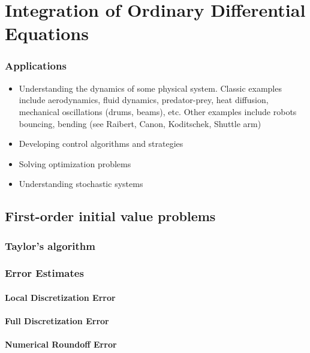 \chapter{Integration of Ordinary Differential Equations}

\subsection*{Applications}
\begin{itemize}
    \item Understanding the dynamics of some physical system. Classic examples include aerodynamics, fluid dynamics, predator-prey, heat diffusion, mechanical oscillations (drums, beams), etc. Other examples include robots bouncing, bending (see Raibert, Canon, Koditschek, Shuttle arm)
    \item Developing control algorithms and strategies
    \item Solving optimization problems
    \item Understanding stochastic systems
\end{itemize}

\section{First-order initial value problems}

\subsection{Taylor's algorithm}

\subsection{Error Estimates}

\subsubsection{Local Discretization Error}

\subsubsection{Full Discretization Error}

\subsubsection{Numerical Roundoff Error}

